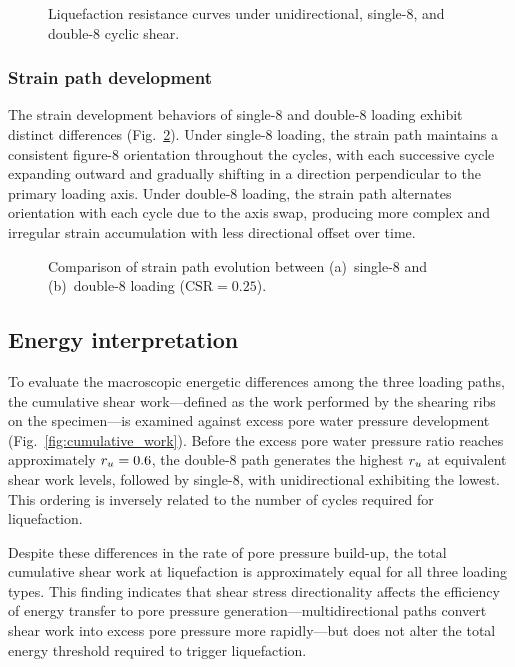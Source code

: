 \begin{figure}
  \centering
  \caption{Liquefaction resistance curves under unidirectional, single-8,
    and double-8 cyclic shear.}
  \label{fig:liq_resistance}
\end{figure}

\subsubsection{Strain path development}

The strain development behaviors of single-8 and double-8 loading exhibit distinct differences (Fig.~\ref{fig:strain_evolution}). Under single-8 loading, the strain path maintains a consistent figure-8 orientation throughout the cycles, with each successive cycle expanding outward and gradually shifting in a direction perpendicular to the primary loading axis. Under double-8 loading, the strain path alternates orientation with each cycle due to the axis swap, producing more complex and irregular strain accumulation with less directional offset over time.

\begin{figure}
  \centering
  \hfill
  \caption{Comparison of strain path evolution between
    (a)~single-8 and (b)~double-8 loading ($\mathrm{CSR} = 0.25$).}
  \label{fig:strain_evolution}
\end{figure}


\subsection{Energy interpretation}
\label{subsec:energy}

To evaluate the macroscopic energetic differences among the three loading paths, the cumulative shear work---defined as the work performed by the shearing ribs on the specimen---is examined against excess pore water pressure development (Fig.~\ref{fig:cumulative_work}). Before the excess pore water pressure ratio reaches approximately $r_u = 0.6$, the double-8 path generates the highest $r_u$ at equivalent shear work levels, followed by single-8, with unidirectional exhibiting the lowest. This ordering is inversely related to the number of cycles required for liquefaction.

Despite these differences in the rate of pore pressure build-up, the total cumulative shear work at liquefaction is approximately equal for all three loading types. This finding indicates that shear stress directionality affects the efficiency of energy transfer to pore pressure generation---multidirectional paths convert shear work into excess pore pressure more rapidly---but does not alter the total energy threshold required to trigger liquefaction.

